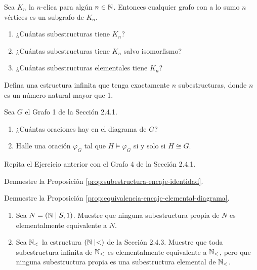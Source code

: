 \documentclass[12pt,a4paper]{book}
\begin{document}
    \begin{ejercicio}
        Sea $K_{n}$ la $n$-clica para algún $n\in\mathbb{N}$. Entonces cualquier grafo con a lo sumo $n$ vértices es un subgrafo
        de $K_{n}$.
        \begin{enumerate}[label=(\alph*)]
            \item ¿Cuántas subestructuras tiene $K_{n}$?
            \item ¿Cuántas subestructuras tiene $K_{n}$ salvo isomorfismo?
            \item ¿Cuántas subestructuras elementales tiene $K_{n}$?
        \end{enumerate}
    \end{ejercicio}

    \begin{ejercicio}
        Defina una estructura infinita que tenga exactamente $n$ subestructuras, donde $n$ es un número natural mayor
        que 1.
    \end{ejercicio}

    \begin{ejercicio}
        Sea $G$ el Grafo 1 de la Sección 2.4.1.
        \begin{enumerate}[label=(\alph*)]
            \item ¿Cuántas oraciones hay en el diagrama de $G$?
            \item Halle una oración $\varphi_{G}$ tal que $H\models\varphi_{G}$ si y solo si $H\cong G$.
        \end{enumerate}
    \end{ejercicio}

    \begin{ejercicio}
        Repita el Ejercicio anterior con el Grafo 4 de la Sección 2.4.1.
    \end{ejercicio}

    \begin{ejercicio}\label{ej:subestructura-encaje-identidad-completa}
        Demuestre la Proposición \ref{prop:subestructura-encaje-identidad}.
    \end{ejercicio}

    \begin{ejercicio}\label{ej:diagrama-elemental-completa}
        Demuestre la Proposición \ref{prop:equivalencia-encaje-elemental-diagrama}.
    \end{ejercicio}

    \begin{ejercicio}
        \begin{enumerate}[label=(\alph*)]
            \item Sea $N=(\mathbb{N}\mid S,1)$. Muestre que ninguna subestructura propia de $N$ es elementalmente equivalente a
            $N$.
            \item Sea $\mathbb{N}_{<}$ la estructura $(\mathbb{N}\mid<)$ de la Sección 2.4.3. Muestre que toda subestructura infinita de
            $\mathbb{N}_{<}$ es elementalmente equivalente a $\mathbb{N}_{<}$, pero que ninguna subestructura propia es una subestructura
            elemental de $\mathbb{N}_{<}$.
        \end{enumerate}
    \end{ejercicio}
\end{document}
